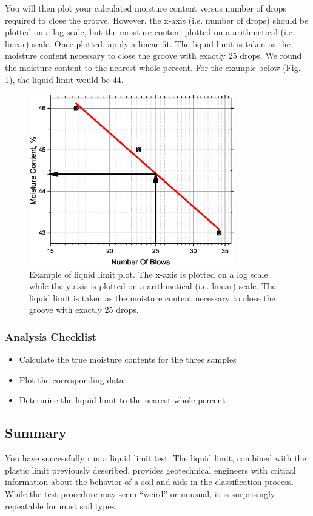 \documentclass[12pt]{article}
\begin{document}
You will then plot your calculated moisture content versus number of drops required to close the groove. However, the x-axis (i.e. number of drops) should be plotted on a log scale, but the moisture content plotted on a arithmetical (i.e. linear) scale. Once plotted, apply a linear fit. The liquid limit is taken as the moisture content necessary to close the groove with exactly 25 drops. We round the moisture content to the nearest whole percent. For the example below (Fig. \ref{fig:exampleLL}), the liquid limit would be 44.

\begin{figure}
    \centering
    \includegraphics[width=0.8\textwidth]{Graph1.eps}
    \caption{Example of liquid limit plot. The x-axis is plotted on a log scale while the y-axis is plotted on a arithmetical (i.e. linear) scale. The liquid limit is taken as the moisture content necessary to close the groove with exactly 25 drops.}
    \label{fig:exampleLL}
\end{figure}

\subsubsection*{Analysis Checklist}
\begin{itemize}
    \item Calculate the true moisture contents for the three samples
    \item Plot the corresponding data
    \item Determine the liquid limit to the nearest whole percent
\end{itemize}

\subsection{Summary}
You have successfully run a liquid limit test. The liquid limit, combined with the plastic limit previously described, provides geotechnical engineers with critical information about the behavior of a soil and aids in the classification process. While the test procedure may seem ``weird'' or unusual, it is surprisingly repeatable for most soil types.
\end{document}
